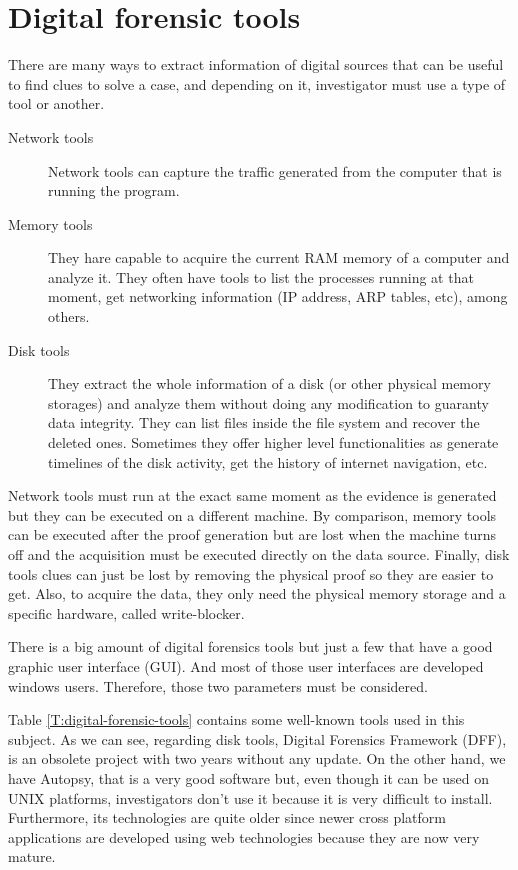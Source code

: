 \chapter{Digital forensic tools}
\label{S:state-of-the-art}

There are many ways to extract information of digital sources that can be
useful to find clues to solve a case, and depending on it, investigator must use
a type of tool or another.

\begin{description}
	\item[Network tools] Network tools can capture the traffic generated from 
	the computer that is running the program.

	\item[Memory tools] They hare capable to acquire the current RAM memory of
	a computer and analyze it. They often have tools to list the processes
	running at that moment, get networking information (IP address, ARP tables,
	etc), among others.

	\item[Disk tools] They extract the whole information of a disk (or other
	physical memory storages) and analyze them without doing any modification
	to guaranty data integrity. They can list files inside the file system and
	recover the deleted ones. Sometimes they offer higher level functionalities 
	as generate timelines of the disk activity, get the history of internet
	navigation, etc.
\end{description}

Network tools must run at the exact same moment as the evidence is generated
but they can be executed on a different machine. By comparison, memory tools can
be executed after the proof generation but are lost when the machine turns off
and the acquisition must be executed directly on the data source. Finally, disk
tools clues can just be lost by removing the physical proof so they are easier 
to get. Also, to acquire the data, they only need the physical memory storage
and a specific hardware, called write-blocker.

There is a big amount of digital forensics tools but just a few that have a good
graphic user interface (GUI). And most of those user interfaces are developed 
windows users. Therefore, those two parameters must be considered.

Table \ref{T:digital-forensic-tools} contains some well-known tools used in
this subject. As we can see, regarding disk tools, Digital Forensics Framework 
(DFF), is an obsolete project with two years without any update. On the other
hand, we have Autopsy, that is a very good software but, even though it can be 
used on UNIX platforms, investigators don't use it because it is very difficult
to install. Furthermore, its technologies are quite older since newer cross
platform applications are developed using web technologies because they are now
very mature.


